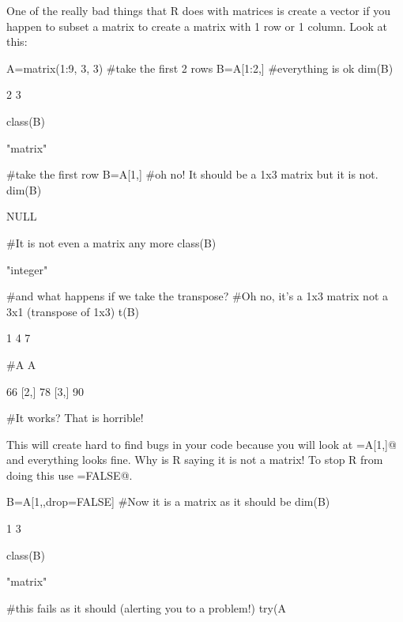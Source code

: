 One of the really bad things that R does with matrices is create a vector if you happen to subset a matrix to create a matrix with 1 row or 1 column.  Look at this:
\begin{Schunk}
\begin{Sinput}
 A=matrix(1:9, 3, 3)
 #take the first 2 rows
 B=A[1:2,]
 #everything is ok
 dim(B)
\end{Sinput}
\begin{Soutput}
[1] 2 3
\end{Soutput}
\begin{Sinput}
 class(B)
\end{Sinput}
\begin{Soutput}
[1] "matrix"
\end{Soutput}
\begin{Sinput}
 #take the first row
 B=A[1,]
 #oh no! It should be a 1x3 matrix but it is not.
 dim(B)
\end{Sinput}
\begin{Soutput}
NULL
\end{Soutput}
\begin{Sinput}
 #It is not even a matrix any more
 class(B)
\end{Sinput}
\begin{Soutput}
[1] "integer"
\end{Soutput}
\begin{Sinput}
 #and what happens if we take the transpose?
 #Oh no, it's a 1x3 matrix not a 3x1 (transpose of 1x3)
 t(B)
\end{Sinput}
\begin{Soutput}
     [,1] [,2] [,3]
[1,]    1    4    7
\end{Soutput}
\begin{Sinput}
 #A%*%B should fail because A is (3x3) and B is (1x3)
 A%*%B
\end{Sinput}
\begin{Soutput}
     [,1]
[1,]   66
[2,]   78
[3,]   90
\end{Soutput}
\begin{Sinput}
 #It works? That is horrible!
\end{Sinput}
\end{Schunk}
This will create hard to find bugs in your code because you will look at \verb@B=A[1,]@ and everything looks fine.  Why is R saying it is not a matrix!  To stop R from doing this use \verb@drop=FALSE@.
\begin{Schunk}
\begin{Sinput}
 B=A[1,,drop=FALSE]
 #Now it is a matrix as it should be
 dim(B)
\end{Sinput}
\begin{Soutput}
[1] 1 3
\end{Soutput}
\begin{Sinput}
 class(B)
\end{Sinput}
\begin{Soutput}
[1] "matrix"
\end{Soutput}
\begin{Sinput}
 #this fails as it should (alerting you to a problem!)
 try(A%*%B)
\end{Sinput}
\end{Schunk}

